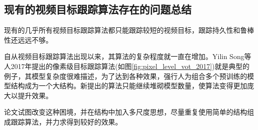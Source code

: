 \subsection{现有的视频目标跟踪算法存在的问题总结} \label{section:vot_problems}
现有的几乎所有视频目标跟踪算法都只能跟踪较短的视频目标，跟踪持久性和鲁棒性还远远不够。
\par
自从视频目标跟踪算法出现以来，其算法的复杂程度就一直在增加。Yilin Song等人2017年提出的像素级目标跟踪算法(如图\ref{fig:pixel_level_vot_2017})就是典型的例子，其模型复杂度很难描述，为了达到各种效果，强行人为组合多个预训练的模型结构成为一个大结构。新提出的算法只能继续堆砌模型数量，使算法变得更加庞大以提升效果。
\par
论文试图改变这种困境，并在结构中加入多尺度思想，尽量重复使用简单的结构组成跟踪算法，并力求得到较好的效果。
